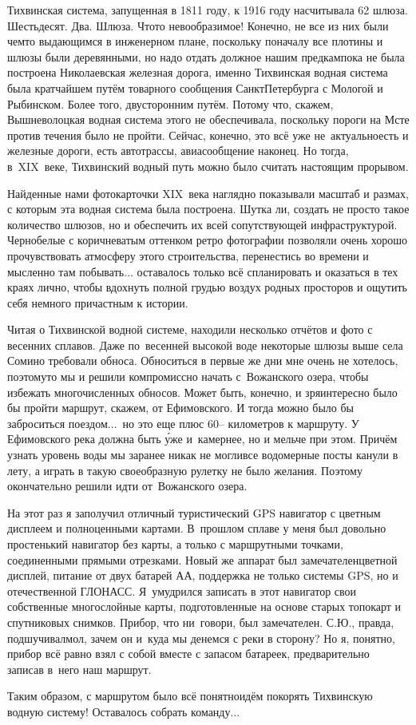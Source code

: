 \newpage
Тихвинская система, запущенная в 1811 году, к 1916 году насчитывала 62 шлюза. Шестьдесят. Два. Шлюза. Что\sdash то невообразимое! Конечно, не все из них были чем\sdash то выдающимся в инженерном плане, поскольку поначалу все плотины и шлюзы были деревянными, но надо отдать должное нашим предкам\mdash пока не была построена Николаевская железная дорога, именно Тихвинская водная система была кратчайшем путём товарного сообщения Санкт\sdash Петербурга с Мологой и Рыбинском. Более того, двусторонним путём. Потому что, скажем, Вышневолоцкая водная система этого не обеспечивала, поскольку пороги на Мсте против течения было не пройти. Сейчас, конечно, это всё уже не~актуально\mdash есть и железные дороги, есть автотрассы, авиасообщение наконец. Но тогда, в~XIX~веке, Тихвинский водный путь можно было считать настоящим прорывом. 

Найденные нами фотокарточки XIX~века наглядно показывали масштаб и размах, с которым эта водная система была построена. Шутка ли, создать не просто такое количество шлюзов, но и обеспечить их всей сопутствующей инфраструктурой. Черно\sdash белые с коричневатым оттенком ретро фотографии позволяли очень хорошо прочувствовать атмосферу этого строительства, перенестись во времени и мысленно там побывать$\ldots$ оставалось только всё спланировать и оказаться в тех краях лично, чтобы вдохнуть полной грудью воздух родных просторов и ощутить себя немного причастным к истории.

Читая о Тихвинской водной системе, находили несколько отчётов и фото с весенних сплавов. Даже по~весенней высокой воде некоторые шлюзы выше села Сомино требовали обноса. Обноситься в первые же дни мне очень не хотелось, поэтому\sdash то мы и решили компромиссно начать с~Вожанского озера, чтобы избежать многочисленных обносов. Может быть, конечно, и зря\mdash интересно было бы пройти маршрут, скажем, от Ефимовского. И тогда можно было бы заброситься поездом$\ldots$~но это еще плюс 60\thinspace\nobreakdash-- километров к маршруту. У Ефимовского река должна быть \'{у}же и~камернее, но и мельче при этом. Причём узнать уровень воды мы заранее никак не могли\mdash все водомерные посты канули в лету, а играть в такую своеобразную рулетку не было желания. Поэтому окончательно решили идти от~Вожанского озера. 

На этот раз я заполучил отличный туристический GPS навигатор с цветным дисплеем и полноценными картами. В~прошлом сплаве у меня был довольно простенький навигатор без карты, а только с маршрутными точками, соединенными прямыми отрезками. Новый же аппарат был замечателен\mdash цветной дисплей, питание от двух батарей АА, поддержка не только системы GPS, но и отечественной ГЛОНАСС. Я~умудрился записать в этот навигатор свои собственные многослойные карты, подготовленные на основе старых топокарт и спутниковых снимков. Прибор, что ни~говори, был замечателен. С.Ю., правда, подшучивал\mdash мол, зачем он и~куда мы денемся с реки в сторону? Но я, понятно, прибор всё равно взял с собой вместе с запасом батареек, предварительно записав в~него наш маршрут.

Таким образом, с маршрутом было всё понятно\mdash идём покорять Тихвинскую водную систему! Оставалось собрать команду$\ldots$

\begin{center}
\end{center}
